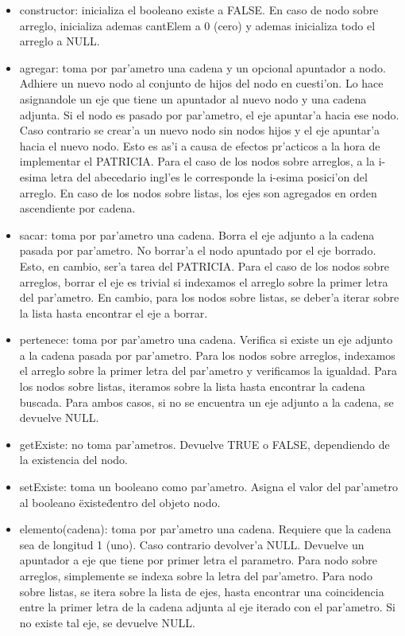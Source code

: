\begin{itemize}
\item constructor: inicializa el booleano existe a FALSE. En caso de nodo sobre arreglo, inicializa ademas cantElem a 0 (cero) y ademas inicializa todo el arreglo a NULL.

\item agregar: toma por par'ametro una cadena y un opcional apuntador a nodo. Adhiere un nuevo nodo al conjunto de hijos del nodo en cuesti'on. Lo hace asignandole un eje que tiene un apuntador al nuevo nodo y una cadena adjunta. Si el nodo es pasado por par'ametro, el eje apuntar'a hacia ese nodo. Caso contrario se crear'a un nuevo nodo sin nodos hijos y el eje apuntar'a hacia el nuevo nodo. Esto es as'i a causa de efectos pr'acticos a la hora de implementar el PATRICIA. Para el caso de los nodos sobre arreglos, a la i-esima letra del abecedario ingl'es le corresponde la i-esima posici'on del arreglo. En caso de los nodos sobre listas, los ejes son agregados en orden ascendiente por cadena.

\item sacar: toma por par'ametro una cadena. Borra el eje adjunto a la cadena pasada por par'ametro. No borrar'a el nodo apuntado por el eje borrado. Esto, en cambio, ser'a tarea del PATRICIA. Para el caso de los nodos sobre arreglos, borrar el eje es trivial si indexamos el arreglo  sobre la primer letra del par'ametro. En cambio, para los nodos sobre listas, se deber'a iterar sobre la lista hasta encontrar el eje a borrar.

\item pertenece: toma por par'ametro una cadena. Verifica si existe un eje adjunto a la cadena pasada por par'ametro. Para los nodos sobre arreglos, indexamos el arreglo sobre la primer letra del par'ametro y verificamos la igualdad. Para los nodos sobre listas, iteramos sobre la lista hasta encontrar la cadena buscada. Para ambos casos, si no se encuentra un eje adjunto a la cadena, se devuelve NULL.

\item getExiste: no toma par'ametros. Devuelve TRUE o FALSE, dependiendo de la existencia del nodo.

\item setExiste: toma un booleano como par'ametro. Asigna el valor del par'ametro al booleano \"existe\" dentro del objeto nodo. 

\item elemento(cadena): toma por par'ametro una cadena. Requiere que la cadena sea de longitud 1 (uno). Caso contrario devolver'a NULL. Devuelve un apuntador a eje que tiene por primer letra el parametro. Para nodo sobre arreglos, simplemente se indexa sobre la letra del par'ametro. Para nodo sobre listas, se itera sobre la lista de ejes, hasta encontrar una coincidencia entre la primer letra de la cadena adjunta al eje iterado con el par'ametro. Si no existe tal eje, se devuelve NULL.


\end{itemize}
